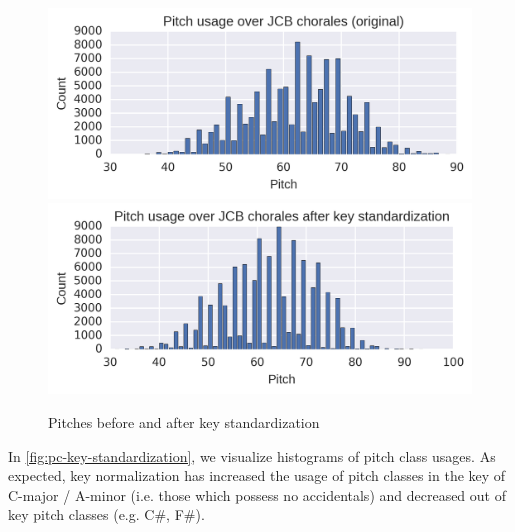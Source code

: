 \begin{figure}[htpb]
    \centering
    \includegraphics[width=1.0\linewidth]{pitch-usage-original.png}
    \includegraphics[width=1.0\linewidth]{pitch-usage-preproc.png}
    \caption{Pitches before and after key standardization}
    \label{fig:pitch-key-standardization}
\end{figure}

In \cref{fig:pc-key-standardization}, we visualize histograms of pitch class usages.
As expected, key normalization has increased the usage of pitch classes in the key of
C-major / A-minor (i.e. those which possess no accidentals) and decreased out of key
pitch classes (e.g. C\#, F\#).


